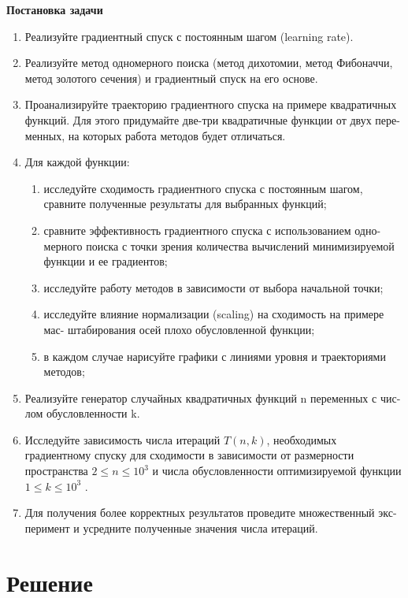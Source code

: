 \documentclass[12pt, a4paper]{article}
\begin{document}
\textbf{Постановка задачи}
\begin{enumerate}
    \item Реализуйте градиентный спуск с постоянным шагом (learning rate).
    \item Реализуйте метод одномерного поиска (метод дихотомии, метод Фибоначчи,
метод золотого сечения) и градиентный спуск на его основе.
    \item Проанализируйте траекторию градиентного спуска на примере квадратичных
функций. Для этого придумайте две-три квадратичные функции от двух пере-
менных, на которых работа методов будет отличаться.
    \item Для каждой функции:
    \begin{enumerate}
        \item исследуйте сходимость градиентного спуска с постоянным шагом, сравните
полученные результаты для выбранных функций;
        \item сравните эффективность градиентного спуска с использованием одно-
мерного поиска с точки зрения количества вычислений минимизируемой
функции и ее градиентов;
        \item исследуйте работу методов в зависимости от выбора начальной точки;
        \item исследуйте влияние нормализации (scaling) на сходимость на примере мас-
штабирования осей плохо обусловленной функции;
        \item в каждом случае нарисуйте графики с линиями уровня и траекториями
методов;
    \end{enumerate}
    \item Реализуйте генератор случайных квадратичных функций n переменных с чис-
лом обусловленности k.
    \item Исследуйте зависимость числа итераций $T (n, k)$, необходимых градиентному
спуску для сходимости в зависимости от размерности пространства $2 \leq n \leq 10^3$
и числа обусловленности оптимизируемой функции $1 \leq k \leq 10^3$ .
    \item Для получения более корректных результатов проведите множественный экс-
перимент и усредните полученные значения числа итераций.
\end{enumerate}

\section{Решение}
\end{document}
